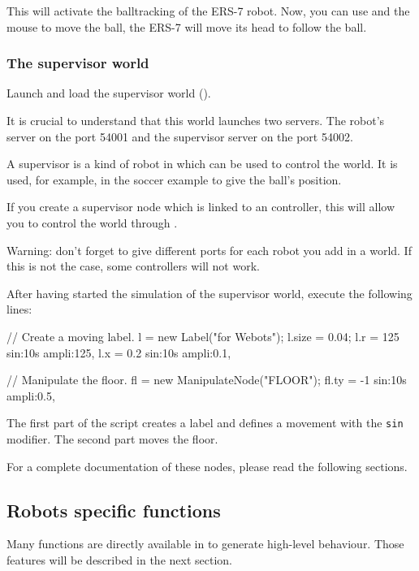 This will activate the balltracking of the ERS-7 robot.  Now, you can
use  and the mouse to move the ball, the ERS-7 will move
its head to follow the ball.


\subsubsection{The supervisor world}

Launch \webots and load the supervisor world
().

It is crucial to understand that this world launches two \urbi
servers.  The robot's server on the port 54001 and the supervisor
server on the port 54002.

A supervisor is a kind of robot in \webots which can be used to control
the world. It is used, for example, in the \webots soccer example to
give the ball's position.

If you create a supervisor node which is linked to an \urbi
controller, this will allow you to control the world through \urbi.

Warning: don't forget to give different ports for each robot you add
in a \webots world. If this is not the case, some controllers will not
work.

After having started the simulation of the supervisor world, execute
the following lines:


\begin{urbiunchecked}
// Create a moving label.
l = new Label("\urbi for Webots");
l.size = 0.04;
l.r = 125 sin:10s ampli:125,
l.x = 0.2 sin:10s ampli:0.1,

// Manipulate the floor.
fl = new ManipulateNode("FLOOR");
fl.ty = -1 sin:10s ampli:0.5,
\end{urbiunchecked}

The first part of the script creates a label and defines a movement
with the \lstinline|sin| modifier. The second part moves the floor.

For a complete documentation of these nodes, please read the following
sections.

\subsection{Robots specific functions}

Many functions are directly available in \us to generate high-level
behaviour. Those features will be described in the next section.


